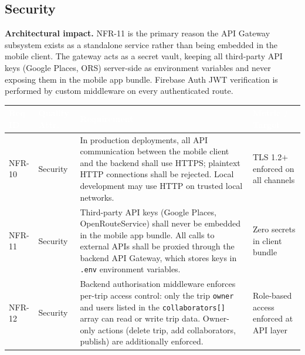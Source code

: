 \documentclass[12pt, a4paper]{article}
\newcommand{\reqid}[1]{\textsc{\small #1}}
\newcommand{\thcell}[1]{\textcolor{white}{\textbf{\small #1}}}
\begin{document}
\subsection{Security}

\begin{tcolorbox}[notebox]
  \textbf{Architectural impact.} NFR-11 is the primary reason the API Gateway subsystem exists as a standalone service rather than being embedded in the mobile client. The gateway acts as a secret vault, keeping all third-party API keys (Google Places, ORS) server-side as environment variables and never exposing them in the mobile app bundle. Firebase Auth JWT verification is performed by custom middleware on every authenticated route.
\end{tcolorbox}

\vspace{0.4em}
\begin{longtable}{C{1.5cm} C{2.4cm} L{7.0cm} C{2.7cm}}
\toprule
{}
\thcell{Req ID} & \thcell{Quality Attr.} & \thcell{Requirement} & \thcell{Metric / Target} \\
\midrule
\endhead
\bottomrule
\endfoot

\reqid{NFR-10} & Security &
In production deployments, all API communication between the mobile client and the backend shall use HTTPS; plaintext HTTP connections shall be rejected. Local development may use HTTP on trusted local networks. &
TLS 1.2$+$ enforced on all channels \\

\reqid{NFR-11} & Security &
Third-party API keys (Google Places, OpenRouteService) shall never be embedded in the mobile app bundle. All calls to external APIs shall be proxied through the backend API Gateway, which stores keys in \texttt{.env} environment variables. &
Zero secrets in client bundle \\

\reqid{NFR-12} & Security &
Backend authorisation middleware enforces per-trip access control: only the trip \texttt{owner} and users listed in the \texttt{collaborators[]} array can read or write trip data. Owner-only actions (delete trip, add collaborators, publish) are additionally enforced. &
Role-based access enforced at API layer \\

\end{longtable}
\end{document}
